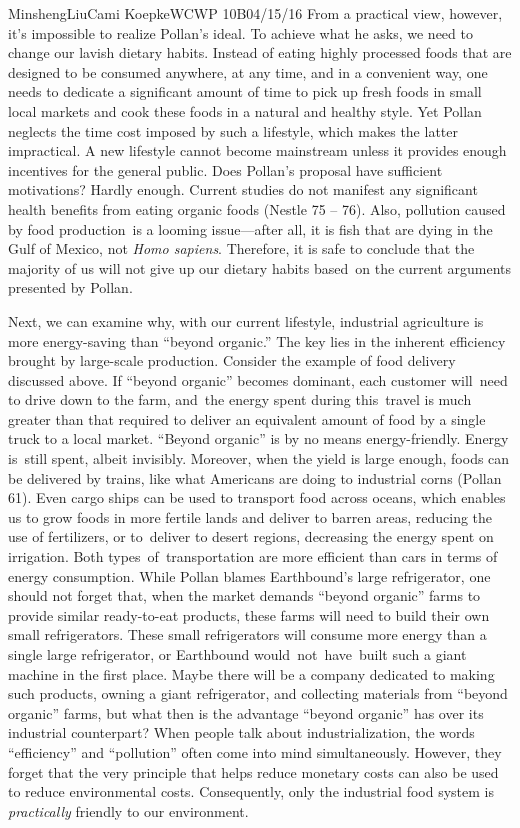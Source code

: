 \documentclass[12pt,letterpaper]{article}
\begin{document}
\begin{mla}{Minsheng}{Liu}{Cami Koepke}{WCWP 10B}{04/15/16}
From a practical view, however, it's impossible to realize Pollan's
ideal. To achieve what he asks, we need to change our lavish dietary
habits. Instead of eating highly processed foods that are designed to be
consumed anywhere, at any time, and in a convenient way, one needs to
dedicate a significant amount of time to pick up fresh foods in small
local markets and cook these foods in a natural and healthy style. Yet
Pollan neglects the time cost imposed by such a lifestyle, which makes
the latter impractical. A new lifestyle cannot become mainstream unless
it provides enough incentives for the general public. Does Pollan's
proposal have sufficient motivations? Hardly enough. Current studies do
not manifest any significant health benefits from eating organic foods
(Nestle 75 -- 76). Also, pollution caused by food production~is a
looming issue---after all, it is fish that are dying in the Gulf of
Mexico, not \emph{Homo sapiens}. Therefore, it is safe to conclude that
the majority of us will not give up our dietary habits based~on the
current arguments presented by Pollan.

Next, we can examine why, with our current lifestyle, industrial
agriculture is more energy-saving than ``beyond organic.'' The key lies
in the inherent efficiency brought by large-scale production. Consider
the example of food delivery discussed above. If ``beyond organic''
becomes dominant, each customer will~need to drive down to the farm,
and~the energy spent during this~travel is much greater than that
required to deliver an equivalent amount of food by a single truck to a
local market. ``Beyond organic'' is by no means energy-friendly. Energy
is~still spent, albeit invisibly. Moreover, when the yield is large
enough, foods can be delivered by trains, like what Americans are doing
to industrial corns (Pollan 61). Even cargo ships can be used to
transport food across oceans, which enables us to grow foods in more
fertile lands and deliver to barren areas, reducing the use of
fertilizers, or to~deliver to desert regions, decreasing the energy
spent on irrigation. Both types~of~transportation are more efficient
than cars in terms of energy consumption. While Pollan blames
Earthbound's large refrigerator, one should not forget that, when the
market demands ``beyond organic'' farms to provide similar ready-to-eat
products, these farms will need to build their own small refrigerators.
These small refrigerators will consume more energy than a single large
refrigerator, or Earthbound would~not~have~built such a giant machine in
the first place. Maybe there will be a company dedicated to making such
products, owning a giant refrigerator, and collecting materials from
``beyond organic'' farms, but what then is the advantage ``beyond
organic'' has over its industrial counterpart? When people talk about
industrialization, the words ``efficiency'' and ``pollution'' often come
into mind simultaneously. However, they forget that the very principle
that helps reduce monetary costs can also be used to reduce
environmental costs. Consequently, only the industrial food system is
\emph{practically} friendly to our environment.


\end{mla}
\end{document}
